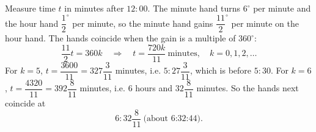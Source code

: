 Measure time $t$ in minutes after $12{:}00$. The minute hand turns $6^\circ$ per minute and the hour hand $\dfrac{1}{2}^\circ$ per minute, so the minute hand gains $\dfrac{11}{2}^\circ$ per minute on the hour hand. The hands coincide when the gain is a multiple of $360^\circ$:
\[
\dfrac{11}{2}t=360k\quad\Longrightarrow\quad t=\dfrac{720k}{11}\ \text{minutes},\quad k=0,1,2,\dots
\]
For $k=5$, $t=\dfrac{3600}{11}=327\dfrac{3}{11}$ minutes, i.e. $5{:}27\dfrac{3}{11}$, which is before $5{:}30$. For $k=6$, $t=\dfrac{4320}{11}=392\dfrac{8}{11}$ minutes, i.e. $6$ hours and $32\dfrac{8}{11}$ minutes. So the hands next coincide at
\[
\boxed{6{:}32\dfrac{8}{11}}\ \text{(about 6:32:44)}.
\]
